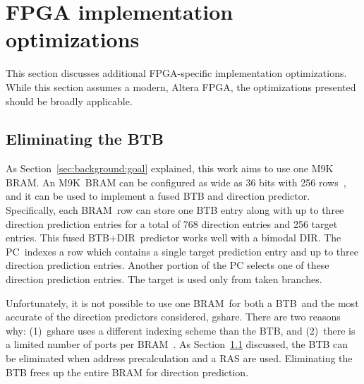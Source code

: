 \section{FPGA implementation optimizations}
\label{sec:min:fpga}

This section discusses additional FPGA-specific implementation optimizations. 
While this section assumes a modern, Altera FPGA, the optimizations presented should be broadly applicable.

\subsection{Eliminating the BTB}
\label{sec:min:fpga:nobtb}
As Section~\ref{sec:background:goal} explained, this work aims to use one M9K BRAM. An M9K\ BRAM can be configured as wide as 36 bits with 256 rows~\cite{StratixIVM9K}, and it can be used to implement a fused BTB and direction predictor. Specifically, each BRAM\ row can store one BTB entry along with up to three direction prediction entries for a total of 768 direction entries and 256 target entries. This fused BTB+DIR\ predictor works well with  a bimodal DIR. The PC\ indexes a row which contains a single target prediction entry and up  to three direction prediction entries. Another portion of the PC selects one of these direction prediction entries. The target is used only from taken branches. 

Unfortunately, it is not possible to use one BRAM\ for both a BTB\ and the most accurate of the direction predictors considered, gshare. There are two reasons why: (1)~gshare uses a different indexing scheme than the BTB, and (2)~there is a limited number of ports per BRAM~\cite{StratixIVM9K}. As Section~\ref{sec:min:fpga:nobtb} discussed, the BTB can be eliminated when address precalculation and a RAS are used. Eliminating the BTB frees up the entire BRAM for direction prediction. 

